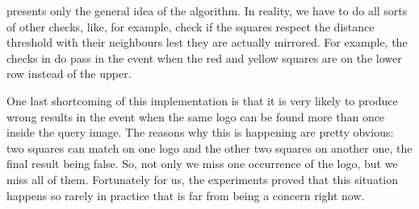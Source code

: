  presents only the general idea of the
algorithm. In reality, we have to do all sorts of other checks, like, for
example, check if the squares respect the distance threshold with their
neighbours lest they are actually mirrored. For example, the checks in
 do pass in the event when the red and
yellow squares are on the lower row instead of the upper.

One last shortcoming of this implementation is that it is very likely to
produce wrong results in the event when the same logo can be found more than
once inside the query image. The reasons why this is happening are pretty
obvious: two squares can match on one logo and the other two squares on
another one, the final result being false. So, not only we miss one occurrence
of the logo, but we miss all of them. Fortunately for us, the experiments
proved that this situation happens so rarely in practice that is far from
being a concern right now.
